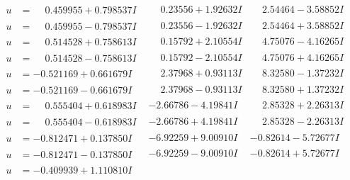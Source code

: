 \documentclass[1p]{elsarticle_modified}
\theoremstyle{definition}
\begin{document}
$$\begin{array}{c|c|c}
\begin{aligned}
u &= \phantom{-}0.459955 + 0.798537 I\end{aligned}
 & \phantom{-}0.23556 + 1.92632 I & \phantom{-}2.54464 - 3.58852 I \\ \hline\begin{aligned}
u &= \phantom{-}0.459955 - 0.798537 I\end{aligned}
 & \phantom{-}0.23556 - 1.92632 I & \phantom{-}2.54464 + 3.58852 I \\ \hline\begin{aligned}
u &= \phantom{-}0.514528 + 0.758613 I\end{aligned}
 & \phantom{-}0.15792 + 2.10554 I & \phantom{-}4.75076 - 4.16265 I \\ \hline\begin{aligned}
u &= \phantom{-}0.514528 - 0.758613 I\end{aligned}
 & \phantom{-}0.15792 - 2.10554 I & \phantom{-}4.75076 + 4.16265 I \\ \hline\begin{aligned}
u &= -0.521169 + 0.661679 I\end{aligned}
 & \phantom{-}2.37968 + 0.93113 I & \phantom{-}8.32580 - 1.37232 I \\ \hline\begin{aligned}
u &= -0.521169 - 0.661679 I\end{aligned}
 & \phantom{-}2.37968 - 0.93113 I & \phantom{-}8.32580 + 1.37232 I \\ \hline\begin{aligned}
u &= \phantom{-}0.555404 + 0.618983 I\end{aligned}
 & -2.66786 - 4.19841 I & \phantom{-}2.85328 + 2.26313 I \\ \hline\begin{aligned}
u &= \phantom{-}0.555404 - 0.618983 I\end{aligned}
 & -2.66786 + 4.19841 I & \phantom{-}2.85328 - 2.26313 I \\ \hline\begin{aligned}
u &= -0.812471 + 0.137850 I\end{aligned}
 & -6.92259 + 9.00910 I & -0.82614 - 5.72677 I \\ \hline\begin{aligned}
u &= -0.812471 - 0.137850 I\end{aligned}
 & -6.92259 - 9.00910 I & -0.82614 + 5.72677 I \\ \hline\begin{aligned}
u &= -0.409939 + 1.110810 I\end{aligned}

\end{array}$$
\end{document}
